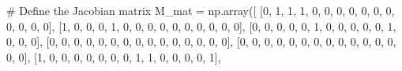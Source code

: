 \documentclass[
  letterpaper,
  DIV=11,
  numbers=noendperiod]{scrreprt}
\newenvironment{Shaded}{\begin{snugshade}}{\end{snugshade}}
\newcommand{\CommentTok}[1]{\textcolor[rgb]{0.37,0.37,0.37}{#1}}
\newcommand{\DecValTok}[1]{\textcolor[rgb]{0.68,0.00,0.00}{#1}}
\newcommand{\NormalTok}[1]{\textcolor[rgb]{0.00,0.23,0.31}{#1}}
\newcommand{\OperatorTok}[1]{\textcolor[rgb]{0.37,0.37,0.37}{#1}}
\begin{document}
\begin{tcolorbox}
\begin{Shaded}
\begin{Highlighting}[]
\CommentTok{\# Define the Jacobian matrix}
\NormalTok{M\_mat }\OperatorTok{=}\NormalTok{ np.array([}
\NormalTok{    [}\DecValTok{0}\NormalTok{, }\DecValTok{1}\NormalTok{, }\DecValTok{1}\NormalTok{, }\DecValTok{1}\NormalTok{, }\DecValTok{0}\NormalTok{, }\DecValTok{0}\NormalTok{, }\DecValTok{0}\NormalTok{, }\DecValTok{0}\NormalTok{, }\DecValTok{0}\NormalTok{, }\DecValTok{0}\NormalTok{, }\DecValTok{0}\NormalTok{, }\DecValTok{0}\NormalTok{, }\DecValTok{0}\NormalTok{, }\DecValTok{0}\NormalTok{, }\DecValTok{0}\NormalTok{],}
\NormalTok{    [}\DecValTok{1}\NormalTok{, }\DecValTok{0}\NormalTok{, }\DecValTok{0}\NormalTok{, }\DecValTok{0}\NormalTok{, }\DecValTok{1}\NormalTok{, }\DecValTok{0}\NormalTok{, }\DecValTok{0}\NormalTok{, }\DecValTok{0}\NormalTok{, }\DecValTok{0}\NormalTok{, }\DecValTok{0}\NormalTok{, }\DecValTok{0}\NormalTok{, }\DecValTok{0}\NormalTok{, }\DecValTok{0}\NormalTok{, }\DecValTok{0}\NormalTok{, }\DecValTok{0}\NormalTok{],}
\NormalTok{    [}\DecValTok{0}\NormalTok{, }\DecValTok{0}\NormalTok{, }\DecValTok{0}\NormalTok{, }\DecValTok{0}\NormalTok{, }\DecValTok{0}\NormalTok{, }\DecValTok{1}\NormalTok{, }\DecValTok{0}\NormalTok{, }\DecValTok{0}\NormalTok{, }\DecValTok{0}\NormalTok{, }\DecValTok{0}\NormalTok{, }\DecValTok{0}\NormalTok{, }\DecValTok{1}\NormalTok{, }\DecValTok{0}\NormalTok{, }\DecValTok{0}\NormalTok{, }\DecValTok{0}\NormalTok{],}
\NormalTok{    [}\DecValTok{0}\NormalTok{, }\DecValTok{0}\NormalTok{, }\DecValTok{0}\NormalTok{, }\DecValTok{0}\NormalTok{, }\DecValTok{0}\NormalTok{, }\DecValTok{0}\NormalTok{, }\DecValTok{0}\NormalTok{, }\DecValTok{0}\NormalTok{, }\DecValTok{0}\NormalTok{, }\DecValTok{0}\NormalTok{, }\DecValTok{0}\NormalTok{, }\DecValTok{0}\NormalTok{, }\DecValTok{0}\NormalTok{, }\DecValTok{0}\NormalTok{, }\DecValTok{0}\NormalTok{],}
\NormalTok{    [}\DecValTok{0}\NormalTok{, }\DecValTok{0}\NormalTok{, }\DecValTok{0}\NormalTok{, }\DecValTok{0}\NormalTok{, }\DecValTok{0}\NormalTok{, }\DecValTok{0}\NormalTok{, }\DecValTok{0}\NormalTok{, }\DecValTok{0}\NormalTok{, }\DecValTok{0}\NormalTok{, }\DecValTok{0}\NormalTok{, }\DecValTok{0}\NormalTok{, }\DecValTok{0}\NormalTok{, }\DecValTok{0}\NormalTok{, }\DecValTok{0}\NormalTok{, }\DecValTok{0}\NormalTok{],}
\NormalTok{    [}\DecValTok{1}\NormalTok{, }\DecValTok{0}\NormalTok{, }\DecValTok{0}\NormalTok{, }\DecValTok{0}\NormalTok{, }\DecValTok{0}\NormalTok{, }\DecValTok{0}\NormalTok{, }\DecValTok{0}\NormalTok{, }\DecValTok{0}\NormalTok{, }\DecValTok{1}\NormalTok{, }\DecValTok{1}\NormalTok{, }\DecValTok{0}\NormalTok{, }\DecValTok{0}\NormalTok{, }\DecValTok{0}\NormalTok{, }\DecValTok{0}\NormalTok{, }\DecValTok{1}\NormalTok{],}

\end{Highlighting}
\end{Shaded}
\end{tcolorbox}
\end{document}
